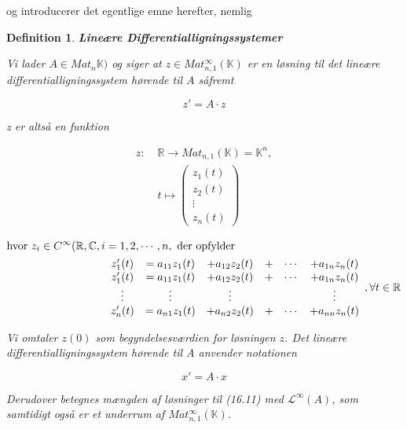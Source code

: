 \documentclass[paper=a4, fontsize=11pt]{scrartcl} %
\newtheorem*{definition}{Definition}
\newenvironment{cstmdefinition}[1]{\begin{definition} {\normalfont\textbf{#1}}}{\end{definition}}
\begin{document}
			og introducerer det egentlige emne herefter, nemlig
			
			
			\begin{cstmdefinition}{Lineære Differentialligningssystemer}
				
				
				Vi lader $A \in Mat_n{\mathbb{K}})$ og siger at $z \in Mat_{n,1}^{\infty}(\mathbb{K})$ er en løsning til det lineære differentialligningssystem hørende til $A$ såfremt
				
				\[z' = A \cdot z\]
				
				z er altså en funktion
				
				\begin{align*}
				z: \; &\mathbb{R} \rightarrow Mat_{n,1}(\mathbb{K}) = \mathbb{K}^n,\\
				&t \mapsto 
				\begin{pmatrix} 
				z_1(t) \\ z_2(t) \\ \vdots \\ z_n(t)
				\end{pmatrix} 
				\end{align*}
				
				\begin{align*}
				\mbox{hvor } z_i \in C^{\infty}(\mathbb{R},\mathbb{C}, i &= 1,2, \cdots, n,\mbox{ der opfylder}\\
				&\begin{array}{c c c c c c}
				z'_1(t) &= a_{11}z_1(t) &+ a_{12}z_2(t) &+ &\cdots &+ a_{1n}z_n(t)\\
				z'_1(t) &= a_{11}z_1(t) &+ a_{12}z_2(t) &+ &\cdots &+ a_{1n}z_n(t)	\\
				\vdots  & \vdots & \vdots & & & \vdots\\
				z'_n(t) &= a_{n1}z_1(t) &+ a_{n2}z_2(t) &+ &\cdots &+ a_{nn}z_n(t)
				\end{array}, \forall t \in \mathbb{R} 
				\end{align*}
				
				Vi omtaler $z(0)$ som begyndelsesværdien for løsningen $z$. Det lineære differentialligningssystem hørende til $A$ anvender notationen
				
				\[x' = A \cdot x \tag{16.11}\]
				
				Derudover betegnes mængden af løsninger til (16.11) med $\mathcal{L}^{\infty}(A)$, som samtidigt også er et underrum af $Mat_{n,1}^{\infty}(\mathbb{K})$.  
				
			\end{cstmdefinition}
			
\end{document}
